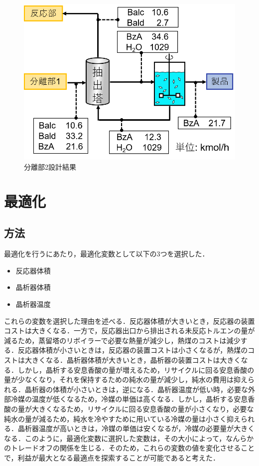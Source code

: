 \documentclass[a4j]{jsreport}
\begin{document}
\begin{figure}[htbp]
  \centering
  \includegraphics[scale=0.7]{Separion2Conclusion.png}
  \caption{分離部2設計結果}
  \label{分離部2設計結果}
\end{figure}

\newpage
\chapter{最適化}
\section{方法}
最適化を行うにあたり，最適化変数として以下の3つを選択した．
\begin{itemize}
  \item 反応器体積
  \item 晶析器体積
  \item 晶析器温度
\end{itemize}

これらの変数を選択した理由を述べる．反応器体積が大きいとき，反応器の装置コストは大きくなる．一方で，反応器出口から排出される未反応トルエンの量が減るため，蒸留塔のリボイラーで必要な熱量が減少し，熱煤のコストは減少する．反応器体積が小さいときは，反応器の装置コストは小さくなるが，熱煤のコストは大きくなる．晶析器体積が大きいとき，晶析器の装置コストは大きくなる．しかし，晶析する安息香酸の量が増えるため，リサイクルに回る安息香酸の量が少なくなり，それを保持するための純水の量が減少し，純水の費用は抑えられる．晶析器の体積が小さいときは，逆になる．晶析器温度が低い時，必要な外部冷媒の温度が低くなるため，冷媒の単価は高くなる．しかし，晶析する安息香酸の量が大きくなるため，リサイクルに回る安息香酸の量が小さくなり，必要な純水の量が減るため，純水を冷やすために用いている冷媒の量は小さく抑えられる．晶析器温度が高いときは，冷媒の単価は安くなるが，冷媒の必要量が大きくなる．このように，最適化変数に選択した変数は，その大小によって，なんらかのトレードオフの関係を生じる．そのため，これらの変数の値を変化させることで，利益が最大となる最適点を探索することが可能であると考えた．
\end{document}

